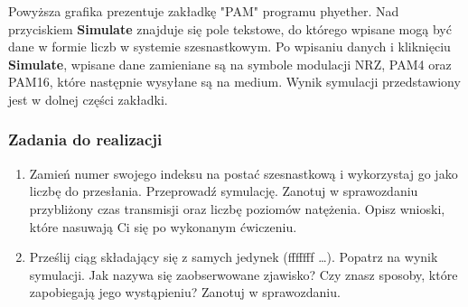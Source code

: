 
Powyższa grafika prezentuje zakładkę "PAM" programu phyether. Nad przyciskiem \textbf{Simulate} znajduje się pole tekstowe, do którego wpisane mogą być dane w formie
liczb w systemie szesnastkowym. Po wpisaniu danych i kliknięciu \textbf{Simulate}, wpisane dane zamieniane są na symbole modulacji NRZ, PAM4 oraz PAM16, które
następnie wysyłane są na medium. Wynik symulacji przedstawiony jest w dolnej części zakładki.

\subsubsection{Zadania do realizacji}

\begin{enumerate}
    \item Zamień numer swojego indeksu na postać szesnastkową i wykorzystaj go jako liczbę do przesłania. Przeprowadź symulację. Zanotuj w sprawozdaniu
    przybliżony czas transmisji oraz liczbę poziomów natężenia. Opisz wnioski, które nasuwają Ci się po wykonanym ćwiczeniu.
    \item Prześlij ciąg składający się z samych jedynek (fffffff \dots). Popatrz na wynik symulacji. Jak nazywa się zaobserwowane zjawisko? Czy znasz sposoby,
    które zapobiegają jego wystąpieniu? Zanotuj w sprawozdaniu.
\end{enumerate}
